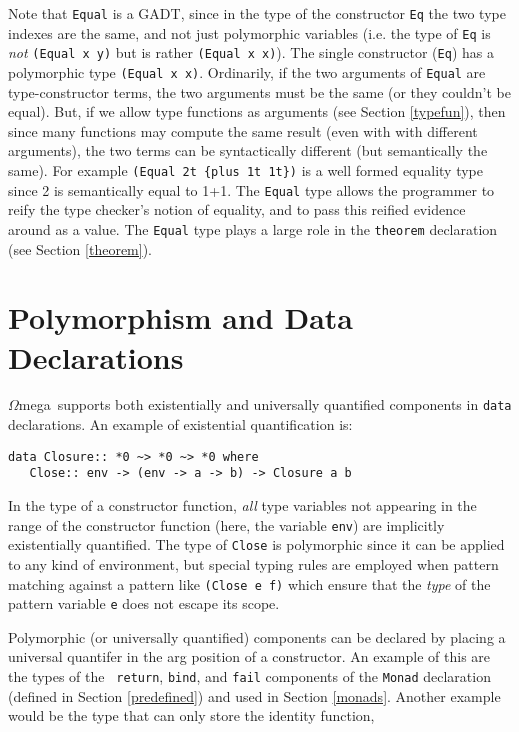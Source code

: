 \documentclass[11pt,twoside]{article}
\newcommand{\om}{$\Omega$mega}
\begin{document}
Note that {\tt Equal} is a GADT, since in the type of the constructor {\tt Eq} the two type indexes
are the same, and not just polymorphic variables (i.e. the type of
{\tt Eq} is {\em not} {\tt (Equal x y)} but is rather {\tt (Equal x x)}).
The single constructor ({\tt Eq}) has a polymorphic type {\tt(Equal x x)}.
Ordinarily, if the two arguments of {\tt Equal} are type-constructor terms,
the two arguments must be the same (or they couldn't be equal). But, if we
allow type functions as arguments (see Section \ref{typefun}), then since many functions may compute the
same result (even with with different arguments), the two terms can be
syntactically different (but semantically the same).  
For example \verb+(Equal 2t {plus 1t 1t})+ is a well formed equality type
since 2 is semantically equal to 1+1.
The {\tt Equal} type allows the programmer to reify
the type checker's notion of equality, and to pass this reified evidence
around as a value. The {\tt Equal} type plays a large role
in the {\tt theorem} declaration (see Section \ref{theorem}).

\section{Polymorphism and Data Declarations}

\om\ supports both existentially and universally quantified components in {\tt data}
declarations. An example of existential quantification is:
\begin{verbatim}
data Closure:: *0 ~> *0 ~> *0 where
   Close:: env -> (env -> a -> b) -> Closure a b
\end{verbatim}
In the type of a constructor function, {\em all} type variables not appearing
in the range of the constructor function (here, the variable {\tt env})
are implicitly existentially quantified. The type of {\tt Close} is polymorphic
since it can be applied to any kind of environment, but special typing rules
are employed when pattern matching against a pattern like \verb+(Close e f)+
which ensure that the {\em type} of the pattern variable {\tt e} does not escape its scope.

Polymorphic (or universally quantified) components can be declared by placing a universal quantifer in the
arg position of a constructor. An example of this are the types of the {\tt
return}, {\tt bind}, and {\tt fail} components of the {\tt Monad} declaration
(defined in Section \ref{predefined}) and used in Section \ref{monads}. Another
example would be the type that can only store the identity function,
\end{document}
